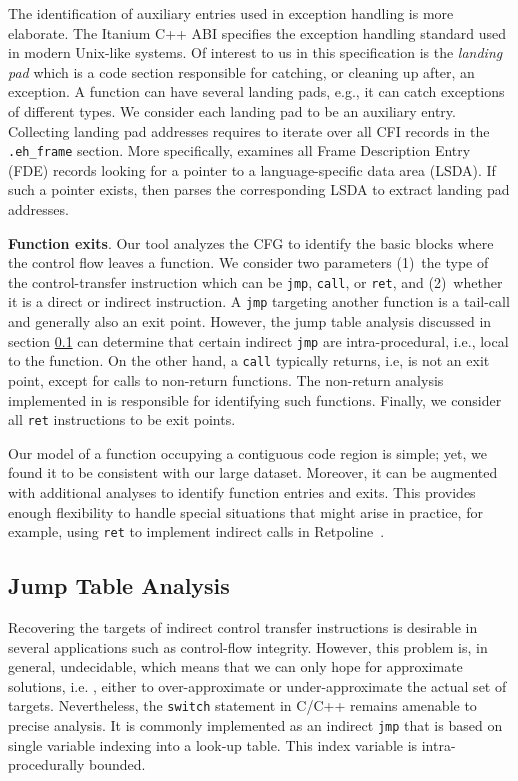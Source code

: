 The identification of auxiliary entries used in exception handling is more elaborate.
The Itanium C++ ABI specifies the exception handling standard used in modern Unix-like systems.
Of interest to us in this specification is the \textit{landing pad} which is a code section responsible for catching, or cleaning up after, an exception.
A function can have several landing pads, e.g., it can catch exceptions of different types.
We consider each landing pad to be an auxiliary entry.
Collecting landing pad addresses requires {\bcov} to iterate over all CFI records in the \texttt{.eh\_frame} section.
More specifically, {\bcov} examines all Frame Description Entry (FDE) records looking for a pointer to a language-specific data area (LSDA).
If such a pointer exists, then {\bcov} parses the corresponding LSDA to extract landing pad addresses.

\textbf{Function exits}.
Our tool analyzes the CFG to identify the basic blocks where the control flow leaves a function.
We consider two parameters 
(1)~the type of the control-transfer instruction which can be \texttt{jmp}, \texttt{call}, or \texttt{ret}, and
(2)~whether it is a direct or indirect instruction.
A \texttt{jmp} targeting another function is a tail-call and generally also an exit point.
However, the jump table analysis discussed in section \ref{sec:jumptable} can determine that certain indirect \texttt{jmp} are intra-procedural, i.e., local to the function.
On the other hand,  a \texttt{call} typically returns, i.e, is not an exit point, except for calls to non-return functions.
The non-return analysis implemented in {\bcov} is responsible for identifying such functions.
Finally, we consider all \texttt{ret} instructions to be exit points.

Our model of a function occupying a contiguous code region is simple; yet, we found it to be consistent with our large dataset.
Moreover, it can be augmented with additional analyses to identify function entries and exits.
This provides enough flexibility to handle special situations that might arise in practice, 
for example, using \texttt{ret} to implement indirect calls in Retpoline~\cite{RetpolineTurner}.


\subsection{Jump Table Analysis}
\label{sec:jumptable}

Recovering the targets of indirect control transfer instructions is desirable in several applications such as control-flow integrity.
However, this problem is, in general, undecidable, which means that we can only hope for approximate solutions, i.e. , either to over-approximate or under-approximate the actual set of targets.
Nevertheless, the \texttt{switch} statement in C/C++ remains amenable to precise analysis.
It is commonly implemented as an indirect \texttt{jmp} that is based on single variable indexing into a look-up table. 
This index variable is intra-procedurally bounded.

